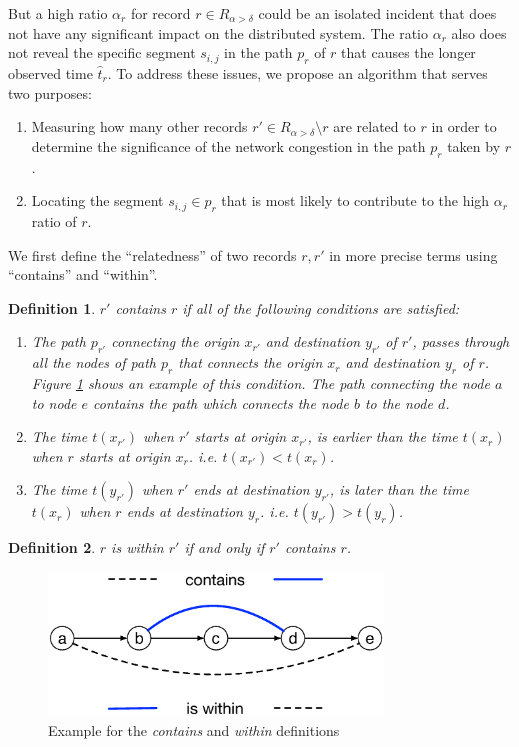 \documentclass[conference]{IEEEtran.1.8}
\newtheorem{definition}{Definition}
\begin{document}
But a high ratio $\alpha_r$ for record $r \in R_{\alpha > \delta}$ could be an isolated incident that does not have any significant impact on the distributed system. The ratio $\alpha_r$ also does not reveal the specific segment $s_{i,j}$ in the path $p_r$ of $r$ that causes the longer observed time $\hat{t}_r$. To address these issues, we propose an algorithm that serves two purposes:
\begin{enumerate}
	\item Measuring how many other records $r' \in R_{\alpha > \delta}\setminus{r}$ are related to $r$ in order to determine the significance of the network congestion in the path $p_r$ taken by $r$.
	\item Locating the segment $s_{i,j} \in p_r$ that is most likely to contribute to the high $\alpha_r$ ratio of $r$.
\end{enumerate}
We first define the ``relatedness'' of two records $r, r'$ in more precise terms using ``contains'' and ``within''.
\begin{definition}
	$r'$ \emph{contains} $r$ if all of the following conditions are satisfied: 
	\begin{enumerate}
		\item The path $p_{r'}$ connecting the origin $x_{r'}$ and destination $y_{r'}$ of $r'$, passes through all the nodes of path $p_{r}$ that connects the origin $x_{r}$ and destination $y_{r}$ of $r$. Figure \ref{fig:contain_within_example} shows an example of this condition. The path connecting the node $a$ to node $e$ contains the path which connects the node $b$ to the node $d$.
		\item The time $t(x_{r'})$ when $r'$ starts at origin $x_{r'}$, is earlier than the time $t(x_{r})$ when $r$ starts at origin $x_{r}$. i.e. $t(x_{r'}) < t(x_{r})$.
		\item The time $t(y_{r'})$ when $r'$ ends at destination $y_{r'}$, is later than the time $t(x_{r})$ when $r$ ends at destination $y_{r}$. i.e. $t(y_{r'}) > t(y_{r})$.
	\end{enumerate}
\end{definition}
\begin{definition}
	$r$ is \emph{within} $r'$ if and only if $r'$ contains $r$.
\end{definition}

\begin{figure}
	\centering
	\includegraphics[width=3.5in]{contain_within_example}
	\caption{Example for the \emph{contains} and \emph{within} definitions}
	\label{fig:contain_within_example}
\end{figure}
\end{document}
